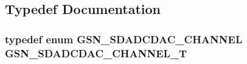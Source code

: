\subsection{Typedef Documentation}
\hypertarget{a00583_ad966c1e6c604f6107d0b76e6390e58ff}{
\subsubsection[{GSN\_\-SDADCDAC\_\-CHANNEL\_\-T}]{\setlength{\rightskip}{0pt plus 5cm}typedef enum {\bf GSN\_\-SDADCDAC\_\-CHANNEL} {\bf GSN\_\-SDADCDAC\_\-CHANNEL\_\-T}}}
\label{a00583_ad966c1e6c604f6107d0b76e6390e58ff}


